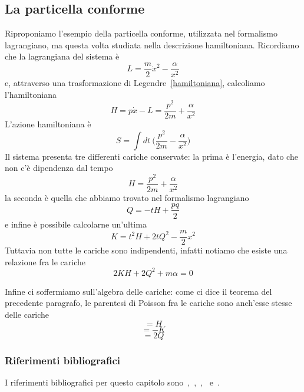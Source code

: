 \subsection{La particella conforme}
    Riproponiamo l'esempio della particella conforme, utilizzata nel formalismo lagrangiano, ma questa volta studiata nella descrizione hamiltoniana. Ricordiamo che la lagrangiana del sistema è 
\begin{equation*}
    L = \frac{m}{2} \dot x^2 - \frac{\alpha}{x^2}
\end{equation*}
    e, attraverso una trasformazione di Legendre~\eqref{hamiltoniana}, calcoliamo l'hamiltoniana
\begin{equation*}
    H = p \dot x - L = \frac{p^2}{2m} + \frac{\alpha}{x^2}
\end{equation*}
    L'azione hamiltoniana è
\begin{equation*}
    S = \int dt~ \Big (\frac{p^2}{2m} - \frac{\alpha}{x^2} \Big)
\end{equation*}
    Il sistema presenta tre differenti cariche conservate: la prima è l'energia, dato che non c'è dipendenza dal tempo
\begin{equation*}
    H = \frac{p^2}{2m} + \frac{\alpha}{x^2}
\end{equation*}
    la seconda è quella che abbiamo trovato nel formalismo lagrangiano
\begin{equation*}
    Q = -tH + \frac{pq}{2}
\end{equation*}
    e infine è possibile calcolarne un'ultima
\begin{equation*}
    K = t^2H + 2 t Q^2 - \frac{m}{2} x^2
\end{equation*}  
    Tuttavia non tutte le cariche sono indipendenti, infatti notiamo che esiste una relazione fra le cariche 
\begin{equation*}
    2KH + 2Q^2 + m\alpha = 0
\end{equation*}

    Infine ci soffermiamo sull'algebra delle cariche: come ci dice il teorema del precedente paragrafo, le parentesi di Poisson fra le cariche sono anch'esse stesse delle cariche
\begin{equation*}
    [Q, ~H] = H
\end{equation*}
\begin{equation*}
    [Q, ~K] = -K
\end{equation*}
\begin{equation*}
    [K, ~H] = 2Q
\end{equation*}

\subsubsection{Riferimenti bibliografici}
    I riferimenti bibliografici per questo capitolo sono~\cite{landaumecc},~\cite{goldstein},~\cite{banados},~\cite{hill} e~\cite{bastianelli}.
